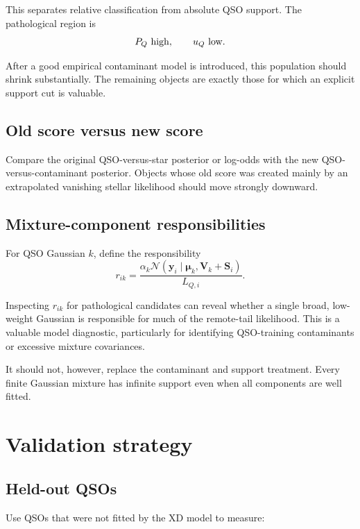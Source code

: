 \documentclass[11pt]{article}
\begin{document}
This separates relative classification from absolute QSO support. The
pathological region is
%
\begin{equation}
P_Q\ {\rm high},
\qquad
u_Q\ {\rm low}.
\end{equation}

After a good empirical contaminant model is introduced, this population
should shrink substantially. The remaining objects are exactly those for
which an explicit support cut is valuable.

\subsection{Old score versus new score}

Compare the original QSO-versus-star posterior or log-odds with the new
QSO-versus-contaminant posterior. Objects whose old score was created mainly
by an extrapolated vanishing stellar likelihood should move strongly downward.

\subsection{Mixture-component responsibilities}

For QSO Gaussian $k$, define the responsibility
%
\begin{equation}
r_{ik}
=
\frac{
\alpha_k
\mathcal{N}
(\bm{y}_i\mid\bm{\mu}_k,\bm{V}_k+\bm{S}_i)
}{
L_{Q,i}
}.
\end{equation}

Inspecting $r_{ik}$ for pathological candidates can reveal whether a single
broad, low-weight Gaussian is responsible for much of the remote-tail
likelihood. This is a valuable model diagnostic, particularly for identifying
QSO-training contaminants or excessive mixture covariances.

It should not, however, replace the contaminant and support treatment. Every
finite Gaussian mixture has infinite support even when all components are
well fitted.

\section{Validation strategy}

\subsection{Held-out QSOs}

Use QSOs that were not fitted by the XD model to measure:
\end{document}
